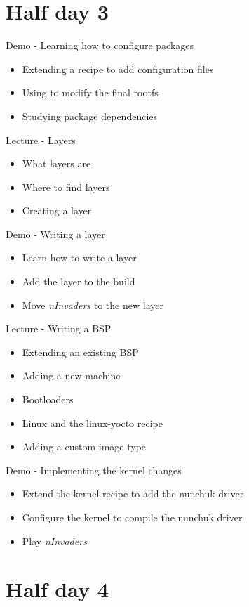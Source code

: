 \documentclass[a4paper,12pt,obeyspaces,spaces,hyphens]{article}
\begin{document}
\section{Half day 3}

\feagendaonecolumn
{Demo - Learning how to configure packages}
{
  \begin{itemize}
  \item Extending a recipe to add configuration files
  \item Using  to modify the final rootfs
  \item Studying package dependencies
  \end{itemize}
}

\feagendatwocolumn
{Lecture - Layers}
{
  \begin{itemize}
  \item What layers are
  \item Where to find layers
  \item Creating a layer
  \end{itemize}
}
{Demo - Writing a layer}
{
  \begin{itemize}
  \item Learn how to write a layer
  \item Add the layer to the build
  \item Move {\em nInvaders} to the new layer
  \end{itemize}
}

\feagendatwocolumn
{Lecture - Writing a BSP}
{
  \begin{itemize}
  \item Extending an existing BSP
  \item Adding a new machine
  \item Bootloaders
  \item Linux and the linux-yocto recipe
  \item Adding a custom image type
  \end{itemize}
}
{Demo - Implementing the kernel changes}
{
  \begin{itemize}
  \item Extend the kernel recipe to add the nunchuk driver
  \item Configure the kernel to compile the nunchuk driver
  \item Play {\em nInvaders}
  \end{itemize}
}

\section{Half day 4}
\end{document}
